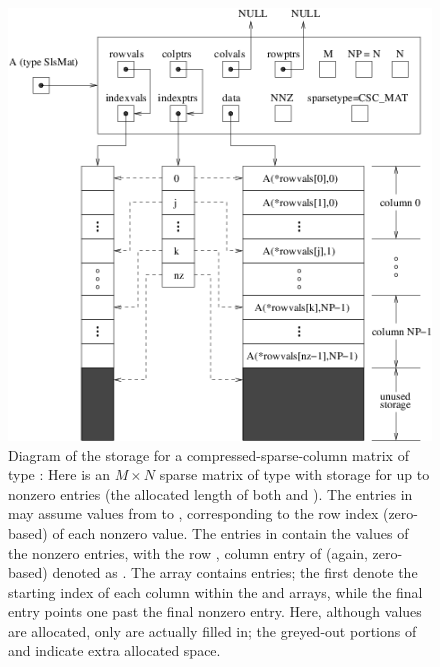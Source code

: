 \documentclass[letterpaper,10pt,english]{sphinxmanual}
\begin{document}
\begin{figure}[htbp]
\centering
\capstart

\includegraphics{cscmat.png}
\caption{Diagram of the storage for a compressed-sparse-column matrix of
type {\hyperref[linear_solvers/SLS:c.SlsMat]{\emph{}}}: Here  is an \(M \times N\) sparse
matrix of type {\hyperref[linear_solvers/SLS:c.SlsMat]{\emph{}}} with storage for up to 
nonzero entries (the allocated length of both  and
).  The entries in  may assume values from
 to , corresponding to the row index (zero-based) of
each nonzero value.  The entries in  contain the values of
the nonzero entries, with the row , column  entry of
 (again, zero-based) denoted as .  The 
array contains  entries; the first  denote the starting
index of each column within the  and  arrays,
while the final entry points one past the final nonzero entry.
Here, although  values are allocated, only  are
actually filled in; the greyed-out portions of  and
 indicate extra allocated space.}\label{linear_solvers/SLS:sls-figure}\end{figure}
\end{document}
